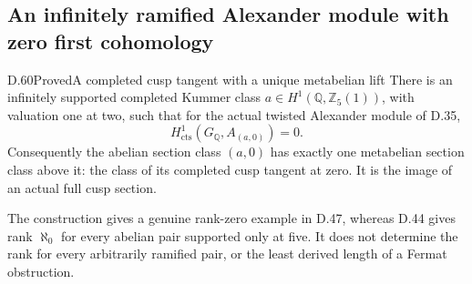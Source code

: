 \subsection{An infinitely ramified Alexander module with zero first cohomology}

\begin{statement}{D.60}{Proved}{A completed cusp tangent with a unique metabelian lift}
There is an infinitely supported completed Kummer class
\(a\in H^1(\mathbb Q,\mathbb Z_5(1))\), with valuation one at two,
such that for the actual twisted Alexander module of D.35,
\[
          H^1_{\mathrm{cts}}(G_{\mathbb Q},A_{(a,0)})=0.
                                                        \tag{D.60.1}
\]
Consequently the abelian section class \((a,0)\) has exactly one
metabelian section class above it: the class of its completed cusp
tangent at zero. It is the image of an actual full cusp section.

The construction gives a genuine rank-zero example in D.47, whereas
D.44 gives rank \(\aleph_0\) for every abelian pair supported only
at five. It does not determine the rank for every arbitrarily
ramified pair, or the least derived length of a Fermat obstruction.
\end{statement}


